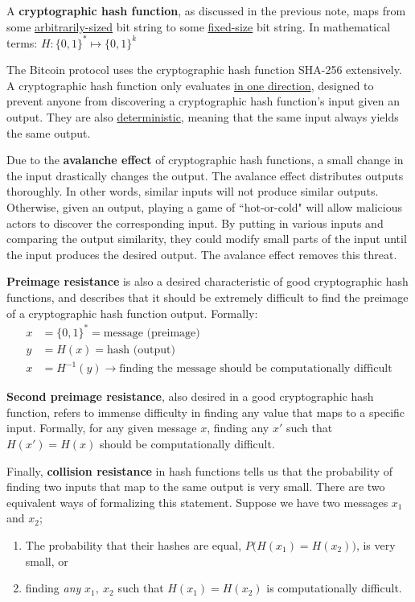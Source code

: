 \documentclass[11pt]{article}
\begin{document}
   A \textbf{cryptographic hash function}, as discussed in the previous note, maps from some \underline{arbitrarily-sized} bit string to some \underline{fixed-size} bit string. In mathematical terms: $H: \{0,1\}^{*} \mapsto \{0,1\}^{k}$
   
   The Bitcoin protocol uses the cryptographic hash function SHA-256 extensively. A cryptographic hash function only evaluates \underline{in one direction}, designed to prevent anyone from discovering a cryptographic hash function's input given an output. They are also \underline{deterministic}, meaning that the same input always yields the same output.
   
   Due to the \textbf{avalanche effect} of cryptographic hash functions, a small change in the input drastically changes the output. The avalance effect distributes outputs thoroughly. In other words, similar inputs will not produce similar outputs. Otherwise, given an output, playing a game of ``hot-or-cold" will allow malicious actors to discover the corresponding input. By putting in various inputs and comparing the output similarity, they could modify small parts of the input until the input produces the desired output. The avalance effect removes this threat.
   
   \textbf{Preimage resistance} is also a desired characteristic of good cryptographic hash functions, and describes that it should be extremely difficult to find the preimage of a cryptographic hash function output. Formally:
   \begin{align*}
       x &= \{0,1\}^{*} = \text{message (preimage)} \\
       y &= H(x) = \text{hash (output)} \\
       x &= H^{-1}(y) \rightarrow \text{finding the message should be computationally difficult}
   \end{align*}
   
   \textbf{Second preimage resistance}, also desired in a good cryptographic hash function, refers to immense difficulty in finding any value that maps to a specific input. Formally, for any given message $x$, finding any $x'$ such that $H(x') = H(x)$ should be computationally difficult.
   
   Finally, \textbf{collision resistance} in hash functions tells us that the probability of finding two inputs that map to the same output is very small. There are two equivalent ways of formalizing this statement. Suppose we have two messages $x_1$ and $x_2$;
   
   \begin{enumerate}
       \item The probability that their hashes are equal, $P\big(H(x_1) = H(x_2)\big)$, is very small, or
       \item finding \textit{any} $x_1,~x_2$ such that $H(x_1)=H(x_2)$ is computationally difficult.
   \end{enumerate}
   
\end{document}
